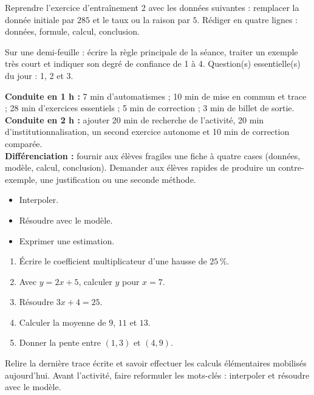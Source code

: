 
\begin{dm}Reprendre l'exercice d'entraînement 2 avec les données suivantes : remplacer la donnée initiale par $285$ et le taux ou la raison par $5$. Rédiger en quatre lignes : données, formule, calcul, conclusion.\end{dm}

\begin{sortie}Sur une demi-feuille : écrire la règle principale de la séance, traiter un exemple très court et indiquer son degré de confiance de 1 à 4. Question(s) essentielle(s) du jour : 1, 2 et 3.\end{sortie}

\ifprof
\begin{methode}
\textbf{Conduite en 1 h :} 7 min d'automatismes ; 10 min de mise en commun et trace ; 28 min d'exercices essentiels ; 5 min de correction ; 3 min de billet de sortie.\\
\textbf{Conduite en 2 h :} ajouter 20 min de recherche de l'activité, 20 min d'institutionnalisation, un second exercice autonome et 10 min de correction comparée.\\
\textbf{Différenciation :} fournir aux élèves fragiles une fiche à quatre cases (données, modèle, calcul, conclusion). Demander aux élèves rapides de produire un contre-exemple, une justification ou une seconde méthode.
\end{methode}
\fi
{}
\begin{objectifs}\begin{itemize}\item Interpoler.\item Résoudre avec le modèle.\item Exprimer une estimation.\end{itemize}\end{objectifs}
\begin{automatismes}\begin{enumerate}\item Écrire le coefficient multiplicateur d'une hausse de $25\,\%$. \item Avec $y=2x+5$, calculer $y$ pour $x=7$. \item Résoudre $3x+4=25$. \item Calculer la moyenne de $9$, $11$ et $13$. \item Donner la pente entre $(1,3)$ et $(4,9)$. \end{enumerate}\end{automatismes}
\begin{prerequis}Relire la dernière trace écrite et savoir effectuer les calculs élémentaires mobilisés aujourd'hui. Avant l'activité, faire reformuler les mots-clés : interpoler et résoudre avec le modèle.\end{prerequis}

